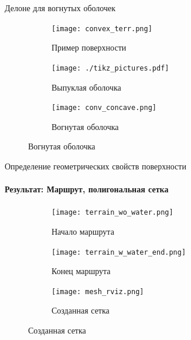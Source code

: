 
\begin{frame}[t]{Делоне для вогнутых оболочек}
    \begin{figure}[H]
        \begin{subfigure}[t]{0.3\textwidth}
            \centering\texttt{[image: convex\_terr.png]}
            \caption*{Пример поверхности}
        \end{subfigure}
        \hfill
        \begin{subfigure}[t]{0.33\textwidth}
            \centering
            \centering\texttt{[image: ./tikz\_pictures.pdf]}
            \caption*{Выпуклая оболочка}
        \end{subfigure}
        \hfill
        \begin{subfigure}[t]{0.33\textwidth}
            \centering\texttt{[image: conv\_concave.png]}
            \caption*{Вогнутая оболочка}
        \end{subfigure}

    \end{figure}
\end{frame}


\begin{frame}[t]{Определение геометрических свойств поверхности}
    \framesubtitle{Результат: Маршрут, полигональная сетка}
    \begin{figure}[H]
        \begin{subfigure}[t]{0.36\textwidth}
            \centering\texttt{[image: terrain\_wo\_water.png]}
            \caption*{Начало маршрута}
        \end{subfigure}
        \begin{subfigure}[t]{0.36\textwidth}
            \centering\texttt{[image: terrain\_w\_water\_end.png]}
            \caption*{Конец маршрута}
        \end{subfigure}
        \begin{subfigure}[t]{0.26\textwidth}
            \centering\texttt{[image: mesh\_rviz.png]}
            \caption*{Созданная сетка}
        \end{subfigure}
    \end{figure}
\end{frame}


